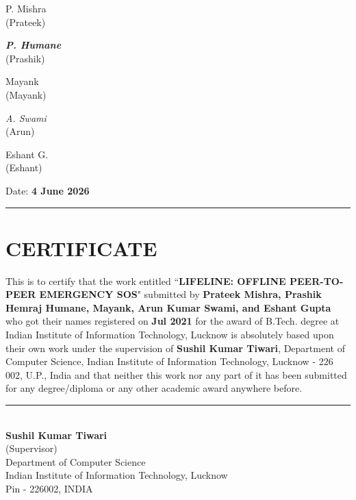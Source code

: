 \noindent
\begin{minipage}{0.18\textwidth}
\centering
{\selectfont\Large P. Mishra}\\
\vspace{0.2cm}
(Prateek)
\end{minipage}
\hfill
\begin{minipage}{0.18\textwidth}
\centering
{\itshape\textbf{P. Humane}}\\
\vspace{0.2cm}
(Prashik)
\end{minipage}
\hfill
\begin{minipage}{0.18\textwidth}
\centering
{\selectfont\Large Mayank}\\
\vspace{0.2cm}
(Mayank)
\end{minipage}
\hfill
\begin{minipage}{0.18\textwidth}
\centering
{\itshape A. Swami}\\
\vspace{0.2cm}
(Arun)
\end{minipage}
\hfill
\begin{minipage}{0.18\textwidth}
\centering
{\selectfont\Large Eshant G.}\\
\vspace{0.2cm}
(Eshant)
\end{minipage}

\vspace{1.5cm}
 
\noindent Date: \textbf{4 June 2026}\\
\rule[0.5em]{33em}{0.5pt}

\clearpage

\chapter*{CERTIFICATE}

This is to certify that the work entitled ``\textbf{LIFELINE: OFFLINE PEER-TO-PEER EMERGENCY SOS}" submitted by \textbf{Prateek Mishra, Prashik Hemraj Humane, Mayank, Arun Kumar Swami, and Eshant Gupta} who got their names registered on \textbf{\;\;\; Jul 2021} for the award of B.Tech. degree at Indian Institute of Information Technology, Lucknow is absolutely based upon their own work under the supervision of \textbf{Sushil Kumar Tiwari}, Department of Computer Science, Indian Institute of Information Technology, Lucknow - 226 002, U.P., India and that neither this work nor any part of it has been submitted for any degree/diploma or any other academic award anywhere before.  

\vspace{4cm}

\begin{center}
    \vspace{2cm}
    \rule[0.5em]{15em}{0.5pt}\\
    \textbf{Sushil Kumar Tiwari}\\
    (Supervisor)\\
    \vspace{0.2cm}
    Department of Computer Science \\
    Indian Institute of Information Technology, Lucknow \\
    Pin - 226002, INDIA 
\end{center}

